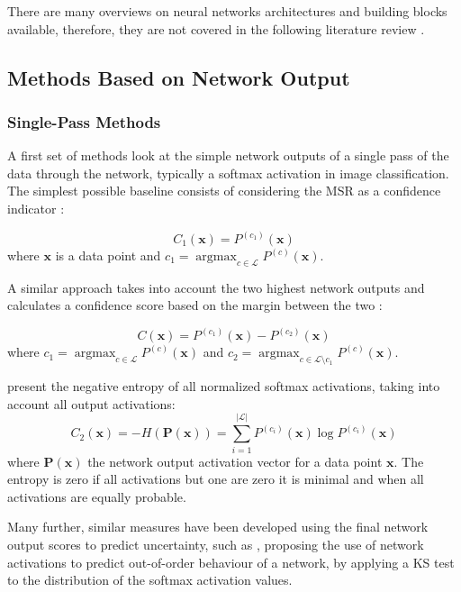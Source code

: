 \documentclass[10pt]{article}
\DeclareMathOperator{\argmax}{argmax}
\begin{document}
There are many overviews on neural networks architectures and building blocks available, therefore, they are not covered in the following literature review \cite{Schmidhuber2015DeepLI, Zhu2017DeepLI, Kampffmeyer2016SemanticSO}.

\subsection{Methods Based on Network Output}
\subsubsection{Single-Pass Methods}
A first set of methods look at the simple network outputs of a single pass of the data through the network, typically a softmax activation in image classification. The simplest possible baseline consists of considering the \gls{MSR} as a confidence indicator \cite{HendrycksG16c, zaragoza}:

\begin{equation}
    C_1(\mathbf{x})=P^{(c_1)}(\mathbf{x})
\end{equation}
where $\mathbf{x}$ is a data point and $c_1=\argmax_{c\in\mathcal{L}}P^{(c)}(\mathbf{x})$.

A similar approach takes into account the two highest network outputs and calculates a confidence score based on the margin between the two \cite{ouerghemmi_two-step_2017, mandelbaum17}:

\begin{equation}
    C(\mathbf{x})=P^{(c_1)}(\mathbf{x})-P^{(c_2)}(\mathbf{x})
\end{equation}
where $c_1=\argmax_{c\in\mathcal{L}}P^{(c)}(\mathbf{x})$ and $c_2=\argmax_{c\in\mathcal{L}\setminus c_1}P^{(c)}(\mathbf{x})$.

\textcite{zaragoza} present the negative entropy of all normalized softmax activations, taking into account all output activations:
\begin{equation}
    \label{eq:net_entropy}
    C_2(\mathbf{x}) = -H(\mathbf{P(\mathbf{x})}) = \sum_{i=1}^{|\mathcal{L}|}P^{(c_i)}(\mathbf{x})\log P^{(c_i)}(\mathbf{x})
\end{equation}
where $\mathbf{\mathbf{P(x)}}$ the network output activation vector for a data point $\mathbf{x}$. The entropy is zero if all activations but one are zero it is minimal and when all activations are equally probable.

Many further, similar measures have been developed using the final network output scores to predict uncertainty, such as \textcite{Sun2018KSconfA}, proposing the use of network activations to predict out-of-order behaviour of a network, by applying a \gls{KS} test to the distribution of the softmax activation values.
\end{document}
